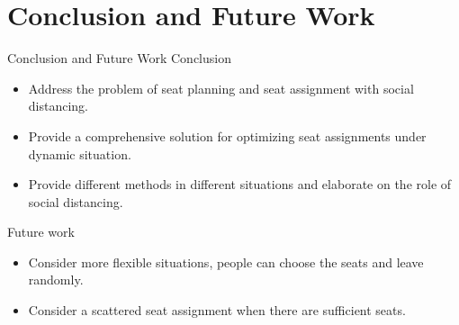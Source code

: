 
\section{Conclusion and Future Work}
\frame{\sectionpage}

\begin{frame}{Conclusion and Future Work}
    Conclusion 

    \begin{itemize}
        \item Address the problem of seat planning and seat assignment with social distancing.
        
        \item Provide a comprehensive solution for optimizing seat assignments under dynamic situation.

        \item Provide different methods in different situations and elaborate on the role of social distancing.
    \end{itemize}

    Future work

    \begin{itemize}        
        \item Consider more flexible situations, people can choose the seats and leave randomly.

        \item Consider a scattered seat assignment when there are sufficient seats.
    \end{itemize}

\end{frame}
